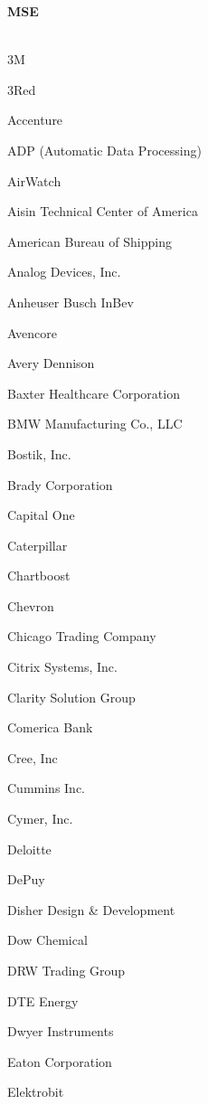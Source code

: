 \documentclass[twoside]{article}
\begin{document}
\begin{center}
\begin{multicols}{5}
        \vspace{1em}
        {\fontsize{14}{16}\selectfont \bf MSE}\\
        \vspace{-1em}
        ~\hrulefill~
        \vspace{-.9em}
        \begin{FlushLeft}
        \begin{compactitem}
        \item 3M
\item 3Red
\item Accenture
\item ADP (Automatic Data Processing)
\item AirWatch
\item Aisin Technical Center of America
\item American Bureau of Shipping
\item Analog Devices, Inc.
\item Anheuser Busch InBev
\item Avencore
\item Avery Dennison
\item Baxter Healthcare Corporation
\item BMW Manufacturing Co., LLC
\item Bostik, Inc.
\item Brady Corporation
\item Capital One
\item Caterpillar
\item Chartboost
\item Chevron
\item Chicago Trading Company
\item Citrix Systems, Inc.
\item Clarity Solution Group
\item Comerica Bank
\item Cree, Inc
\item Cummins Inc.
\item Cymer, Inc.
\item Deloitte
\item DePuy
\item Disher Design \& Development
\item Dow Chemical
\item DRW Trading Group
\item DTE Energy
\item Dwyer Instruments
\item Eaton Corporation
\item Elektrobit

\end{compactitem}
\end{FlushLeft}
\end{multicols}
\end{center}
\end{document}
